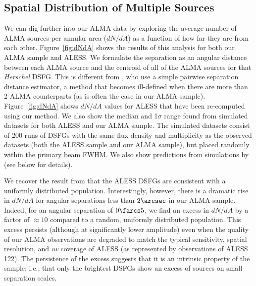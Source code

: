 \documentclass[iop]{emulateapj}
\begin{document}
\subsection{Spatial Distribution of Multiple Sources}\label{sec:spatialdist}

We can dig further into our ALMA data by exploring the average number of ALMA
sources per annular area ($dN/dA$) as a function of how far they are from
each other.  Figure~\ref{fig:dNdA} shows the results of this analysis for both
our ALMA sample and ALESS.  We formulate the separation as an angular distance
between each ALMA source and the centroid of all of the ALMA sources for that
{\it Herschel} DSFG.  This is different from \citet{Hodge:2013qy}, who use a
simple pairwise separation distance estimator, a method that becomes
ill-defined when there are more than 2 ALMA counterparts (as is often the case
in our ALMA sample).  Figure~\ref{fig:dNdA} shows $dN/dA$ values for ALESS that
have been re-computed using our method.  We also show the median and 1$\sigma$
range found from simulated datasets for both ALESS and our ALMA sample.  The
simulated datasets consist of 200 runs of DSFGs with the same flux density and
multiplicity as the observed datasets (both the ALESS sample and our ALMA
sample), but placed randomly within the primary beam FWHM.  We also show
predictions from simulations by \citet{HB13} (see below for details).

We recover the result from \citet{Hodge:2013qy} that the ALESS DSFGs are
consistent with a uniformly distributed population.  Interestingly, however,
there is a dramatic rise in $dN/dA$ for angular separations less than
$2\arcsec$ in our ALMA sample.  Indeed, for an angular separation of
$0\farcs5$, we find an excess in $dN/dA$ by a factor of $\approx 10$ compared
to a random, uniformly distributed population.  This excess persists (although
at significantly lower amplitude) even when the quality of our ALMA
observations are degraded to match the typical sensitivity, spatial resolution,
and {\it uv} coverage of ALESS (as represented by observations of ALESS 122).
The persistence of the excess suggests that it is an intrinsic property of the
sample; i.e., that only the brightest DSFGs show an excess of sources on small
separation scales.  
\end{document}
